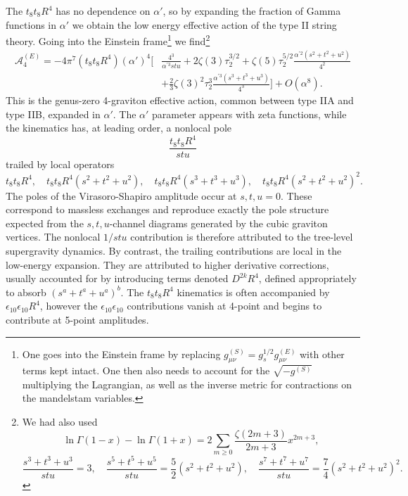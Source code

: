The $t_8t_8R^4$ has no dependence on $\alpha'$, so by expanding the fraction of Gamma functions in $\alpha'$ we obtain the low energy effective action of the type II string theory.
Going into the Einstein frame\footnote{
One goes into the Einstein frame by replacing $g^{(S)}_{\mu\nu}=g_s^{1/2}g^{(E)}_{\mu\nu}$ with other terms kept intact. 
One then also needs to account for the $\sqrt{-g^{(S)}}$ multiplying the Lagrangian, as well as the inverse metric for contractions on the mandelstam variables.
}
we find\footnote{
We had also used
\begin{equation}
\ln\Gamma(1-x)-\ln\Gamma(1+x) = 2\sum_{m\ge0}\frac{\zeta(2m+3)}{2m+3}x^{2m+3},
\end{equation}
\begin{equation}
\frac{s^3+t^3+u^3}{stu}=3,\quad
\frac{s^5+t^5+u^5}{stu}=\frac{5}{2}(s^2+t^2+u^2),\quad
\frac{s^7+t^7+u^7}{stu}=\frac{7}{4}(s^2+t^2+u^2)^2.
\end{equation}
} \cite{Green:1999pv}
\begin{equation}
\begin{aligned}
\mathcal{A}^{(E)}_4
=-4\pi^7(t_8t_8R^4)(\alpha')^4
\Bigg[&\frac{4^3}{\alpha^{\prime 3}stu}+2\zeta(3)\tau_2^{3/2}+
\zeta(5)\tau_2^{5/2}\frac{\alpha^{\prime 2}(s^2+t^2+u^2)}{4^2}\\
&+\frac{2}{3}\zeta(3)^2\tau_2^3\frac{\alpha^{\prime 3}(s^3+t^3+u^3)}{4^3}
\Bigg] +O(\alpha^8).
\end{aligned}
\end{equation}
This is the genus-zero 4-graviton effective action, common between type IIA and type IIB, expanded in $\alpha'$.
The $\alpha'$ parameter appears with zeta functions, while the kinematics has, at leading order, a nonlocal pole
\begin{equation}
\frac{t_8t_8 R^4}{stu}
\end{equation}
trailed by local operators
\begin{equation}
t_8t_8 R^4,\quad
t_8t_8 R^4(s^2+t^2+u^2),\quad
t_8t_8 R^4(s^3+t^3+u^3),\quad
t_8t_8 R^4(s^2+t^2+u^2)^2.
\end{equation}
The poles of the Virasoro-Shapiro amplitude occur at $s,t,u=0$. These correspond to massless exchanges and reproduce exactly the pole structure expected from the $s,t,u$-channel diagrams generated by the cubic graviton vertices.
The nonlocal $1/stu$ contribution is therefore attributed to the tree-level supergravity dynamics.
By contrast, the trailing contributions are local in the low-energy expansion.
They are attributed to higher derivative corrections, usually accounted for by introducing terms denoted $D^{2k}R^4$, defined appropriately to absorb $(s^a+t^a+u^a)^b$.
The $t_8t_8R^4$ kinematics is often accompanied by $\epsilon_{10}\epsilon_{10} R^4$, however the $\epsilon_{10}\epsilon_{10}$ contributions vanish at 4-point and begins to contribute at 5-point amplitudes.

